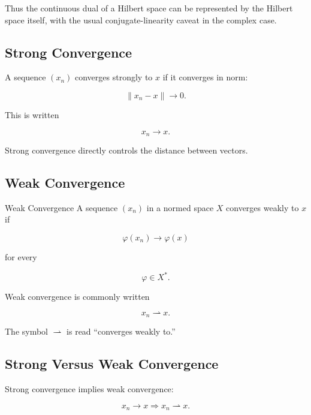 Thus the continuous dual of a Hilbert space can be represented by the
Hilbert space itself, with the usual conjugate-linearity caveat in the
complex case.

\subsection{Strong Convergence}
\label{subsec:strong-convergence}

A sequence \((x_n)\) converges strongly to \(x\) if it converges in norm:

\[
\boxed{
\|x_n-x\|\to0.
}
\]

This is written

\[
\boxed{
x_n\to x.
}
\]

Strong convergence directly controls the distance between vectors.

\subsection{Weak Convergence}
\label{subsec:weak-convergence}

\begin{definitionbox}{Weak Convergence}
A sequence \((x_n)\) in a normed space \(X\) converges weakly to \(x\) if

\[
\boxed{
\varphi(x_n)\to\varphi(x)
}
\]

for every

\[
\varphi\in X^*.
\]
\end{definitionbox}

Weak convergence is commonly written

\[
\boxed{
x_n\rightharpoonup x.
}
\]

The symbol \(\rightharpoonup\) is read ``converges weakly to.''

\subsection{Strong Versus Weak Convergence}
\label{subsec:strong-versus-weak}

Strong convergence implies weak convergence:

\[
\boxed{
x_n\to x
\Longrightarrow
x_n\rightharpoonup x.
}
\]

